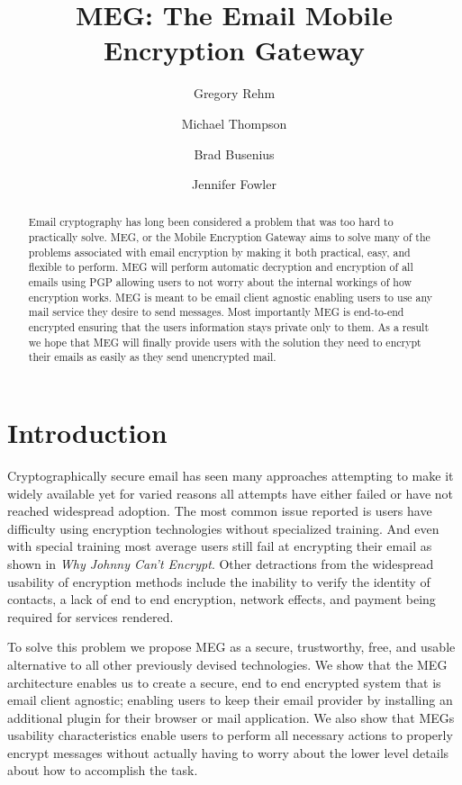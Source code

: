 \documentclass[10pt,twocolumn]{article}
\begin{document}
\title{MEG: The Email Mobile Encryption Gateway}

\author{Gregory Rehm} \author{Michael Thompson} \author{Brad Busenius} \author{Jennifer Fowler}


\maketitle

\begin{abstract}
\par Email cryptography has long been considered a problem that was too hard to practically solve. MEG, or the Mobile Encryption Gateway aims to solve many of the problems associated with email encryption by making it both practical, easy, and flexible to perform. MEG will perform automatic decryption and encryption of all emails using PGP allowing users to not worry about the internal workings of how encryption works. MEG is meant to be email client agnostic enabling users to use any mail service they desire to send messages. Most importantly MEG is end-to-end encrypted ensuring that the users information stays private only to them. As a result we hope that MEG will finally provide users with the solution they need to encrypt their emails as easily as they send unencrypted mail.
\end{abstract}
\vfill
\section{Introduction}
\par Cryptographically secure email has seen many approaches attempting to make it widely available yet for varied reasons all attempts have either failed or have not reached widespread adoption. The most common issue reported is users have difficulty using encryption technologies without specialized training. And even with special training most average users still fail at encrypting their email as shown in \textit{Why Johnny Can't Encrypt}. Other detractions from the widespread usability of encryption methods include the inability to verify the identity of contacts, a lack of end to end encryption, network effects, and payment being required for services rendered.
\par To solve this problem we propose MEG as a secure, trustworthy, free, and usable alternative to all other previously devised technologies. We show that the MEG architecture enables us to create a secure, end to end encrypted system that is email client agnostic; enabling users to keep their email provider by installing an additional plugin for their browser or mail application. We also show that MEGs usability characteristics enable users to perform all necessary actions to properly encrypt messages without actually having to worry about the lower level details about how to accomplish the task.
\end{document}
